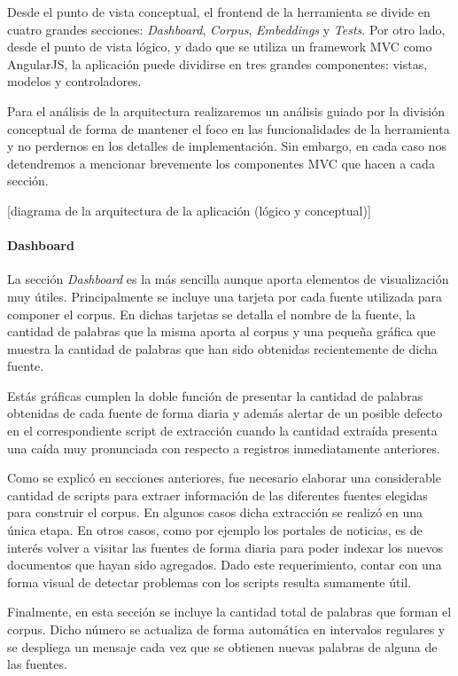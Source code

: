 Desde el punto de vista conceptual, el frontend de la herramienta se divide en cuatro grandes secciones:
\textit{Dashboard}, \textit{Corpus}, \textit{Embeddings} y \textit{Tests}. Por otro lado, desde el punto
de vista lógico, y dado que se utiliza un framework MVC como AngularJS, la aplicación puede dividirse en
tres grandes componentes: vistas, modelos y controladores.

Para el análisis de la arquitectura realizaremos un análisis guiado por la división conceptual de forma
de mantener el foco en las funcionalidades de la herramienta y no perdernos en los detalles de
implementación. Sin embargo, en cada caso nos detendremos a mencionar brevemente los componentes MVC
que hacen a cada sección.

[diagrama de la arquitectura de la aplicación (lógico y conceptual)]

\paragraph{Dashboard}

La sección \textit{Dashboard} es la más sencilla aunque aporta elementos de visualización muy útiles.
Principalmente se incluye una tarjeta por cada fuente utilizada para componer el corpus. En dichas tarjetas
se detalla el nombre de la fuente, la cantidad de palabras que la misma aporta al corpus y una pequeña
gráfica que muestra la cantidad de palabras que han sido obtenidas recientemente de dicha fuente.

Estás gráficas cumplen la doble función de presentar la cantidad de palabras obtenidas de cada fuente
de forma diaria y además alertar de un posible defecto en el correspondiente script de extracción cuando
la cantidad extraída presenta una caída muy pronunciada con respecto a registros inmediatamente anteriores.

Como se explicó en secciones anteriores, fue necesario elaborar una considerable cantidad de scripts para
extraer información de las diferentes fuentes elegidas para construir el corpus. En algunos casos dicha
extracción se realizó en una única etapa. En otros casos, como por ejemplo los portales de noticias, es
de interés volver a visitar las fuentes de forma diaria para poder indexar los nuevos documentos que hayan
sido agregados. Dado este requerimiento, contar con una forma visual de detectar problemas con los scripts
resulta sumamente útil.

Finalmente, en esta sección se incluye la cantidad total de palabras que forman el corpus. Dicho número
se actualiza de forma automática en intervalos regulares y se despliega un mensaje cada vez que se obtienen
nuevas palabras de alguna de las fuentes.

